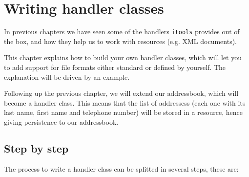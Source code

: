 \chapter{Writing handler classes}

In previous chapters we have seen some of the handlers {\tt itools} provides
out of the box, and how they help us to work with resources (e.g. XML
documents).


This chapter explains how to build your own handler classes, which will let
you to add support for file formats either standard or defined by yourself.
The explanation will be driven by an example.

Following up the previous chapter, we will extend our addressbook, which
will become a handler class. This means that the list of addressess (each
one with its last name, first name and telephone number) will be stored in
a resource, hence giving persistence to our addressbook.

\section{Step by step}

The process to write a handler class can be splitted in several steps, these
are:

